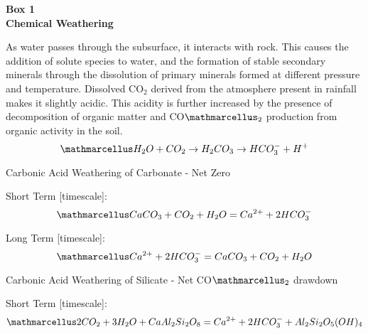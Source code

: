     
\newpage

\begin{tcolorbox}[
    colback=customcolor, %
    colframe=white,      %
    sharp corners,       %
    boxrule=0pt,         %
    breakable,           %
    width=\dimexpr\textwidth+2cm\relax, %
    enlarge left by=-1cm,   %
    leftrule=0mm,        %
    rightrule=0mm,       %
    toprule=0mm,         %
    bottomrule=0mm       %
]
\textbf{\Large Box 1}
\vspace{-3mm}
\myline\\
\textbf{\Large Chemical Weathering}
\vspace{-3mm}
\myline\\
{\footnotesize
As water passes through the subsurface, it interacts with rock. This causes the addition of solute species to water, and the formation of stable secondary minerals through the dissolution of primary minerals formed at different pressure and temperature. Dissolved CO$_2$ derived from the atmosphere present in rainfall makes it slightly acidic. This acidity is further increased by the presence of decomposition of organic matter and CO$\ttmath{_2}$ production from organic activity in the soil.
\[
\ttmath{H_2O + CO_2 \rightarrow H_2CO_3 \rightarrow HCO_3^- + H^+}
\]

Carbonic Acid Weathering of Carbonate - Net Zero
    
    \begin{center}
    
    Short Term [timescale]:
    \[
    \ttmath{CaCO_3 + CO_2 + H_2O = Ca^{2+} + 2HCO_3^-}
    \]
    
    Long Term [timescale]:
    \[
    \ttmath{Ca^{2+} + 2HCO_3^- = CaCO_3 + CO_2 + H_2O}
    \]

    \end{center}
    
    
Carbonic Acid Weathering of Silicate - Net CO$\ttmath{_2}$ drawdown

    \begin{center}

    Short Term [timescale]:
    \[
    \ttmath{2CO_2 + 3H_2O + CaAl_2Si_2O_8 = Ca^{2+} + 2HCO_3^- + Al_2Si_2O_5(OH)_4}
    \]
    

\end{center}}
\end{tcolorbox}
